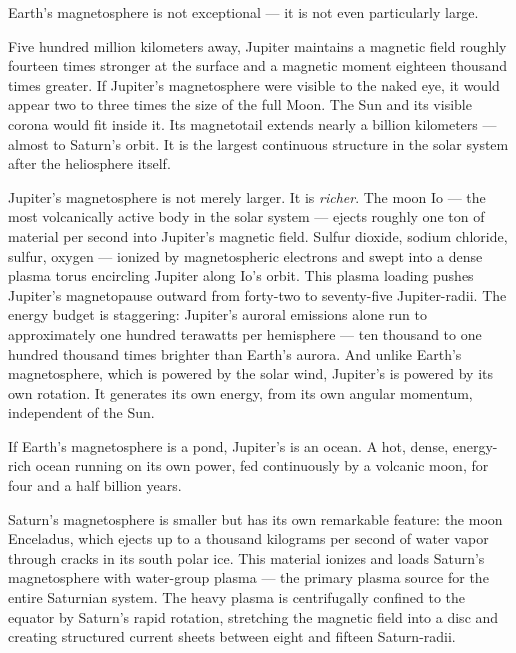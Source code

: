 Earth's magnetosphere is not exceptional --- it is not even particularly large.

Five hundred million kilometers away, Jupiter maintains a magnetic field roughly fourteen times stronger at the surface and a magnetic moment eighteen thousand times greater. If Jupiter's magnetosphere were visible to the naked eye, it would appear two to three times the size of the full Moon. The Sun and its visible corona would fit inside it. Its magnetotail extends nearly a billion kilometers --- almost to Saturn's orbit. It is the largest continuous structure in the solar system after the heliosphere itself.


Jupiter's magnetosphere is not merely larger. It is \textit{richer}. The moon Io --- the most volcanically active body in the solar system --- ejects roughly one ton of material per second into Jupiter's magnetic field. Sulfur dioxide, sodium chloride, sulfur, oxygen --- ionized by magnetospheric electrons and swept into a dense plasma torus encircling Jupiter along Io's orbit. This plasma loading pushes Jupiter's magnetopause outward from forty-two to seventy-five Jupiter-radii. The energy budget is staggering: Jupiter's auroral emissions alone run to approximately one hundred terawatts per hemisphere --- ten thousand to one hundred thousand times brighter than Earth's aurora. And unlike Earth's magnetosphere, which is powered by the solar wind, Jupiter's is powered by its own rotation. It generates its own energy, from its own angular momentum, independent of the Sun.

If Earth's magnetosphere is a pond, Jupiter's is an ocean. A hot, dense, energy-rich ocean running on its own power, fed continuously by a volcanic moon, for four and a half billion years.

Saturn's magnetosphere is smaller but has its own remarkable feature: the moon Enceladus, which ejects up to a thousand kilograms per second of water vapor through cracks in its south polar ice. This material ionizes and loads Saturn's magnetosphere with water-group plasma --- the primary plasma source for the entire Saturnian system. The heavy plasma is centrifugally confined to the equator by Saturn's rapid rotation, stretching the magnetic field into a disc and creating structured current sheets between eight and fifteen Saturn-radii.

